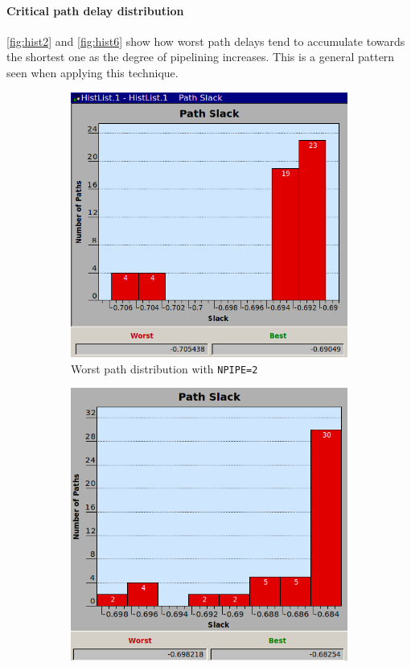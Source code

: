 \paragraph{Critical path delay distribution}
\autoref{fig:hist2} and \autoref{fig:hist6} show how worst path delays tend to accumulate towards the shortest one as the degree of pipelining increases. This is a general pattern seen when applying this technique.
\begin{figure}[h]
	\begin{subfigure}{0.5\textwidth}
		\centering
	\includegraphics[width=\textwidth]{chapter1/images/npipe2.png}
	\caption{Worst path distribution with \texttt{NPIPE=2}}
	\label{fig:hist2}
\end{subfigure}
\begin{subfigure}{0.5\textwidth}
	\centering
	\includegraphics[width=\textwidth]{chapter1/images/npipe6.png}

\end{subfigure}
\end{figure}

